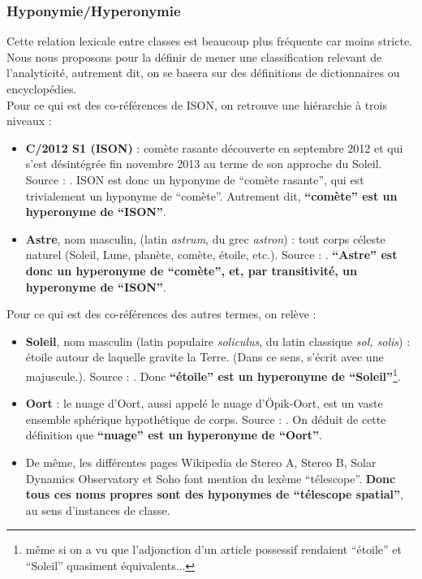 \documentclass[a4paper,10pt]{article}
\begin{document}
		\subsubsection{Hyponymie/Hyperonymie}
			Cette relation lexicale entre classes est beaucoup plus fréquente car moins stricte. Nous nous proposons pour la définir de mener une classification relevant de l'analyticité, autrement dit, on se basera sur des définitions de dictionnaires ou encyclopédies.\\
			Pour ce qui est des co-références de ISON, on retrouve une hiérarchie à trois niveaux :
			\begin{itemize}
				\item \textbf{C/2012 S1 (ISON)} : comète rasante découverte en septembre 2012 et qui s'est désintégrée fin novembre 2013 au terme de son approche du Soleil. Source : \cite{ISON}. ISON est donc un hyponyme de ``comète rasante'', qui est trivialement un hyponyme de ``comète''. Autrement dit, \textbf{``comète'' est un hyperonyme de ``ISON''}.
				\item \textbf{Astre}, nom masculin, (latin \textit{astrum}, du grec \textit{astron}) : tout corps céleste naturel (Soleil, Lune, planète, comète, étoile, etc.). Source : \cite{astre}. \textbf{``Astre'' est donc un hyperonyme de ``comète'', et, par transitivité, un hyperonyme de ``ISON''}.
			\end{itemize}
			Pour ce qui est des co-références des autres termes, on relève :
			\begin{itemize}
				\item \textbf{Soleil}, nom masculin
				(latin populaire \textit{soliculus}, du latin classique \textit{sol, solis}) : étoile autour de laquelle gravite la Terre. (Dans ce sens, s'écrit avec une majuscule.). Source : \cite{soleil}. Donc \textbf{``étoile'' est un hyperonyme de ``Soleil''}\footnote{même si on a vu que l'adjonction d'un article possessif rendaient ``étoile'' et ``Soleil'' quasiment équivalents...}.
				\item \textbf{Oort} : le nuage d'Oort, aussi appelé le nuage d'Öpik-Oort, est un vaste ensemble sphérique hypothétique de corps. Source : \cite{oort}. On déduit de cette définition que \textbf{``nuage'' est un hyperonyme de ``Oort''}.
				\item De même, les différentes pages Wikipedia de Stereo A, Stereo B, Solar Dynamics Observatory et Soho font mention du lexème ``télescope''. \textbf{Donc tous ces noms propres sont des hyponymes de ``télescope spatial''}, au sens d'instances de classe.
			\end{itemize}
\end{document}
